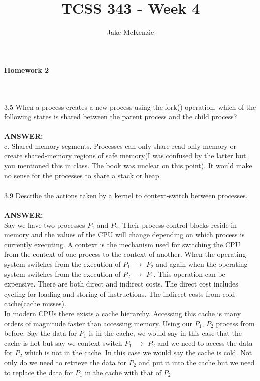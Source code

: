 \documentclass[12pt]{article}
\begin{document}
\title{TCSS 343 - Week 4}
\author{Jake McKenzie}
\maketitle
\noindent\centerline{\textbf{Homework 2}}
\\\\3.5 When a process creates a new process using the fork() operation, which
of the following states is shared between the parent process and the child
process?\\\\
\textbf{ANSWER: } \\c. Shared memory segments. Processes can only share read-only memory or
create shared-memory regions of safe memory(I was confused by the latter but you 
mentioned this in class. The book was unclear on this point). 
It would make no sense for the processes to 
share a stack or heap. \\\\
3.9 Describe the actions taken by a kernel to context-switch between
processes.\\\\
\textbf{ANSWER: } \\
Say we have two processes $P_1$ and $P_2$. Their process control blocks 
reside in memory and the values of the CPU will change depending on which process is 
currently executing. A context is the mechanism used for switching the CPU from 
the context of one process to the context of another. When the operating system 
switches from the execution of $P_1$ $\rightarrow$ $P_2$ and again
when the operating system switches from the execution of 
$P_2$ $\rightarrow$ $P_1$. This operation can be expensive. There are both 
direct and indirect costs. The direct cost includes cycling for loading and
storing of instructions. The indirect costs from cold cache(cache misses).\\

\noindent In modern CPUs there exists a cache hierarchy. Accessing this cache is many 
orders of magnitude faster than accessing memory. Using our $P_1$, $P_2$ process
from before. Say the data for $P_1$ is in the cache, we would say in this case 
that the cache is hot but say we context switch $P_1$ $\rightarrow$ $P_2$ and we 
need to access the data for $P_2$ which is not in the cache. In this case we would say 
the cache is cold. Not only do we need to retrieve the data for $P_2$ and put it into 
the cache but we need to replace the data for $P_1$ in the cache with that of $P_2$.\\
\end{document}
